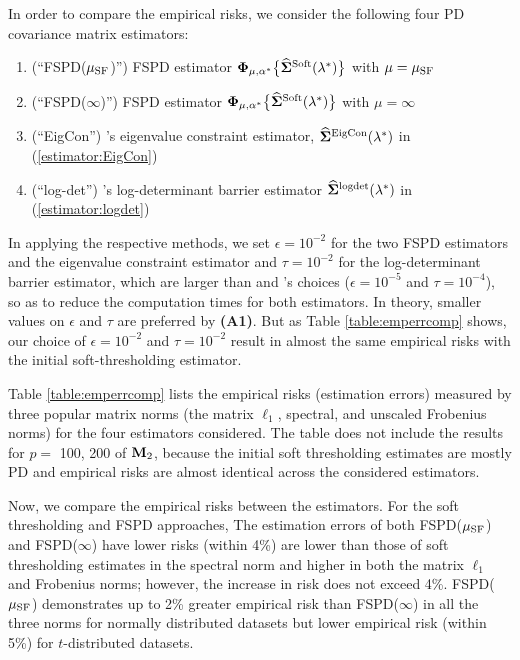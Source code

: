 \documentclass[times,sort&compress,3p]{elsarticle}
\newcommand{\BNUM}{\begin{enumerate}}
\newcommand{\ENUM}{\end{enumerate}}
\begin{document}
In order to compare the empirical risks, we consider the following four PD covariance matrix estimators:
\BNUM
\item (``FSPD($\mu_{\rm SF}$)'') FSPD estimator ${\bf \Phi}_{\mu, \alpha^*}\big\{
	\widehat{\bf \Sigma}^{\rm Soft}(\lambda^*)\big\}$ with $\mu = \mu_{\rm SF}$
\item (``FSPD($\infty$)'') FSPD estimator ${\bf \Phi}_{\mu, \alpha^*}\big\{
	\widehat{\bf \Sigma}^{\rm Soft}(\lambda^*)\big\}$ with $\mu = \infty$
\item (``EigCon'') \citet{Xue2012}'s eigenvalue constraint estimator,
	$\widehat{\bf \Sigma}^{\rm EigCon}(\lambda^*)$ in (\ref{estimator:EigCon})
\item (``log-det'') \citet{Rothman2012}'s log-determinant barrier estimator
	$\widehat{\bf \Sigma}^{\rm logdet}(\lambda^*)$ in (\ref{estimator:logdet})
\ENUM
In applying the respective methods, we set $\epsilon = 10^{-2}$ for the two FSPD estimators and the eigenvalue constraint estimator and $\tau = 10^{-2}$ for the log-determinant barrier estimator, which are larger than \citet{Rothman2012} and \citet{Xue2012}'s choices ($\epsilon = 10^{-5}$ 
and $\tau = 10^{-4}$), so as to reduce the computation times for both estimators. In theory, smaller values on 
$\epsilon$ and $\tau$ are preferred by {\bf (A1)}. But as Table \ref{table:emperrcomp} shows, our choice of 
$\epsilon = 10^{-2}$ and $\tau = 10^{-2}$ result in almost the same empirical risks with the initial soft-thresholding estimator.



Table \ref{table:emperrcomp} lists the empirical risks (estimation errors) measured by three popular matrix norms (the matrix $\ell_1$, spectral,
and unscaled Frobenius norms)
for the four estimators considered. The table does not include the results for $p=$ 100, 200 of ${\bf M}_2$, because the initial soft thresholding estimates are mostly PD and empirical risks  
are almost identical across the considered estimators.


Now, we compare the empirical risks between the estimators. For the soft thresholding and FSPD approaches,
The estimation errors of both FSPD($\mu_{\rm SF}$) and FSPD($\infty$) have lower risks (within 4\%) are lower than those of soft thresholding estimates in the spectral norm and higher in both the matrix $\ell_1$ and Frobenius norms;
however, the increase in risk does not exceed 4\%. FSPD($\mu_{\rm SF}$) demonstrates up to 2\% greater empirical
risk than FSPD($\infty$) in all the three norms for normally distributed datasets but lower empirical risk
 (within 5\%) for $t$-distributed datasets.
\end{document}

